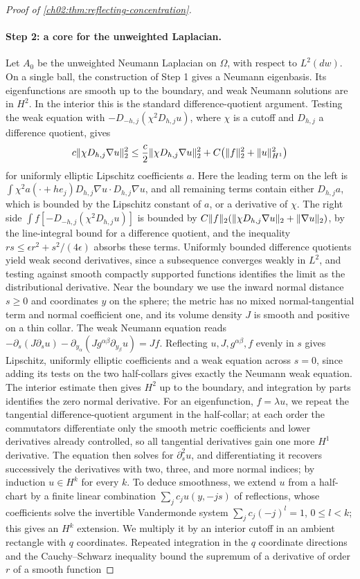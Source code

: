 \begin{proof}[Proof of \cref{ch02:thm:reflecting-concentration}]
\paragraph{Step 2: a core for the unweighted Laplacian.} Let $A_0$ be the unweighted Neumann Laplacian on $\Omega$, with respect to $L^2(dw)$. On a single ball, the construction of Step 1 gives a Neumann eigenbasis. Its eigenfunctions are smooth up to the boundary, and weak Neumann solutions are in $H^2$. In the interior this is the standard difference-quotient argument. Testing the weak equation with $-D_{-h,j}(\chi^2D_{h,j}u)$, where $\chi$ is a cutoff and $D_{h,j}$ a difference quotient, gives
\[
 c\lVert \chi D_{h,j}\nabla u\rVert_2^2\le\frac c2\lVert \chi D_{h,j}\nabla u\rVert_2^2+C\bigl(\lVert f\rVert_2^2+\lVert u\rVert_{H^1}^2\bigr)
\]
for uniformly elliptic Lipschitz coefficients $a$. Here the leading term on the left is $\int\chi^2a(\cdot+he_j)D_{h,j}\nabla u\cdot D_{h,j}\nabla u$, and all remaining terms contain either $D_{h,j}a$, which is bounded by the Lipschitz constant of $a$, or a derivative of $\chi$. The right side $\int f[-D_{-h,j}(\chi^2D_{h,j}u)]$ is bounded by $C\lVert f\rVert_2(\lVert \chi D_{h,j}\nabla u\rVert_2+\lVert \nabla u\rVert_2)$, by the line-integral bound for a difference quotient, and the inequality $rs\le\epsilon r^2+s^2/(4\epsilon)$ absorbs these terms. Uniformly bounded difference quotients yield weak second derivatives, since a subsequence converges weakly in $L^2$, and testing against smooth compactly supported functions identifies the limit as the distributional derivative. Near the boundary we use the inward normal distance $s\ge0$ and coordinates $y$ on the sphere; the metric has no mixed normal-tangential term and normal coefficient one, and its volume density $J$ is smooth and positive on a thin collar. The weak Neumann equation reads $-\partial_s(J\partial_su)-\partial_{y_\alpha}(Jg^{\alpha\beta}\partial_{y_\beta}u)=Jf$. Reflecting $u,J,g^{\alpha\beta},f$ evenly in $s$ gives Lipschitz, uniformly elliptic coefficients and a weak equation across $s=0$, since adding its tests on the two half-collars gives exactly the Neumann weak equation. The interior estimate then gives $H^2$ up to the boundary, and integration by parts identifies the zero normal derivative. For an eigenfunction, $f=\lambda u$, we repeat the tangential difference-quotient argument in the half-collar; at each order the commutators differentiate only the smooth metric coefficients and lower derivatives already controlled, so all tangential derivatives gain one more $H^1$ derivative. The equation then solves for $\partial_s^2u$, and differentiating it recovers successively the derivatives with two, three, and more normal indices; by induction $u\in H^k$ for every $k$. To deduce smoothness, we extend $u$ from a half-chart by a finite linear combination $\sum_jc_ju(y,-js)$ of reflections, whose coefficients solve the invertible Vandermonde system $\sum_jc_j(-j)^l=1$, $0\le l<k$; this gives an $H^k$ extension. We multiply it by an interior cutoff in an ambient rectangle with $q$ coordinates. Repeated integration in the $q$ coordinate directions and the Cauchy--Schwarz inequality bound the supremum of a derivative of order $r$ of a smooth function 
\end{proof}

